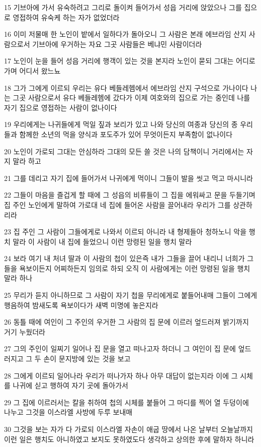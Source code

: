 \par 15 기브아에 가서 유숙하려고 그리로 돌이켜 들어가서 성읍 거리에 앉았으나 그를 집으로 영접하여 유숙케 하는 자가 없었더라
\par 16 이미 저물매 한 노인이 밭에서 일하다가 돌아오니 그 사람은 본래 에브라임 산지 사람으로서 기브아에 우거하는 자요 그곳 사람들은 베냐민 사람이더라
\par 17 노인이 눈을 들어 성읍 거리에 행객이 있는 것을 본지라 노인이 묻되 그대는 어디로 가며 어디서 왔느뇨
\par 18 그가 그에게 이르되 우리는 유다 베들레헴에서 에브라임 산지 구석으로 가나이다 나는 그곳 사람으로서 유다 베들레헴에 갔다가 이제 여호와의 집으로 가는 중인데 나를 자기 집으로 영접하는 사람이 없나이다
\par 19 우리에게는 나귀들에게 먹일 짚과 보리가 있고 나와 당신의 여종과 당신의 종 우리들과 함께한 소년의 먹을 양식과 포도주가 있어 무엇이든지 부족함이 없나이다
\par 20 노인이 가로되 그대는 안심하라 그대의 모든 쓸 것은 나의 담책이니 거리에서는 자지 말라 하고
\par 21 그를 데리고 자기 집에 들어가서 나귀에게 먹이니 그들이 발을 씻고 먹고 마시니라
\par 22 그들이 마음을 즐겁게 할 때에 그 성읍의 비류들이 그 집을 에워싸고 문을 두들기며 집 주인 노인에게 말하여 가로대 네 집에 들어온 사람을 끌어내라 우리가 그를 상관하리라
\par 23 집 주인 그 사람이 그들에게로 나와서 이르되 아니라 내 형제들아 청하노니 악을 행치 말라 이 사람이 내 집에 들었으니 이런 망령된 일을 행치 말라
\par 24 보라 여기 내 처녀 딸과 이 사람의 첩이 있은즉 내가 그들을 끌어 내리니 너희가 그들을 욕보이든지 어찌하든지 임의로 하되 오직 이 사람에게는 이런 망령된 일을 행치 말라 하나
\par 25 무리가 듣지 아니하므로 그 사람이 자기 첩을 무리에게로 붙들어내매 그들이 그에게 행음하여 밤새도록 욕보이다가 새벽 미명에 놓은지라
\par 26 동틀 때에 여인이 그 주인의 우거한 그 사람의 집 문에 이르러 엎드러져 밝기까지 거기 누웠더라
\par 27 그의 주인이 일찌기 일어나 집 문을 열고 떠나고자 하더니 그 여인이 집 문에 엎드러지고 그 두 손이 문지방에 있는 것을 보고
\par 28 그에게 이르되 일어나라 우리가 떠나가자 하나 아무 대답이 없는지라 이에 그 시체를 나귀에 싣고 행하여 자기 곳에 돌아가서
\par 29 그 집에 이르러서는 칼을 취하여 첩의 시체를 붙들어 그 마디를 찍어 열 두덩이에 나누고 그것을 이스라엘 사방에 두루 보내매
\par 30 그것을 보는 자가 다 가로되 이스라엘 자손이 애굽 땅에서 나온 날부터 오늘날까지 이런 일은 행치도 아니하였고 보지도 못하였도다 생각하고 상의한 후에 말하자 하니라

